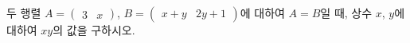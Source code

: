 두 행렬 $A=\begin{pmatrix} 3 & x \end{pmatrix}$, $B=\begin{pmatrix} x+y & 2y+1 \end{pmatrix}$에 대하여 $A=B$일 때, 상수 $x$, $y$에 대하여 $xy$의 값을 구하시오.
